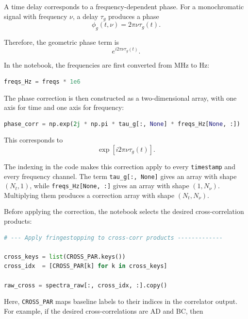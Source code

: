 \documentclass[12pt]{extarticle}
\begin{document}
A time delay corresponds to a frequency-dependent phase. For a monochromatic signal with frequency $\nu$, a delay $\tau_g$ produces a phase
\begin{equation}
\phi_g(t,\nu) = 2\pi \nu \tau_g(t).
\end{equation}

Therefore, the geometric phase term is
\begin{equation}
e^{i2\pi \nu \tau_g(t)}.
\end{equation}

In the notebook, the frequencies are first converted from MHz to Hz:

\begin{lstlisting}[language=Python]
freqs_Hz = freqs * 1e6
\end{lstlisting}

The phase correction is then constructed as a two-dimensional array, with one axis for time and one axis for frequency:

\begin{lstlisting}[language=Python]
phase_corr = np.exp(2j * np.pi * tau_g[:, None] * freqs_Hz[None, :])
\end{lstlisting}

This corresponds to
\begin{equation}
\exp\left[i2\pi \nu \tau_g(t)\right].
\end{equation}

The indexing in the code makes this correction apply to every \texttt{timestamp} and every frequency channel. The term \texttt{tau\_g[:, None]} gives an array with shape $(N_t, 1)$, while \texttt{freqs\_Hz[None, :]} gives an array with shape $(1, N_\nu)$. Multiplying them produces a correction array with shape $(N_t, N_\nu)$.

Before applying the correction, the notebook selects the desired cross-correlation products:

\begin{lstlisting}[language=Python]
# --- Apply fringestopping to cross-corr products -------------

cross_keys = list(CROSS_PAR.keys())
cross_idx  = [CROSS_PAR[k] for k in cross_keys]

raw_cross = spectra_raw[:, cross_idx, :].copy()
\end{lstlisting}

Here, \texttt{CROSS\_PAR} maps baseline labels to their indices in the correlator output. For example, if the desired cross-correlations are AD and BC, then
\end{document}
